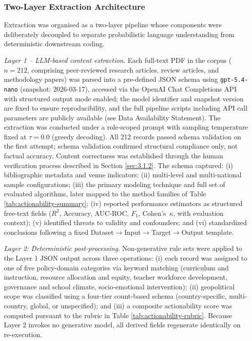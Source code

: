 \documentclass{ieeeaccess}
\begin{document}
\subsubsection{Two-Layer Extraction Architecture}\label{subsec:data-extraction}

Extraction was organised as a two-layer pipeline whose components were deliberately decoupled to separate probabilistic language understanding from deterministic downstream coding.

\emph{Layer 1 -- LLM-based content extraction.} Each full-text PDF in the corpus ($n = 212$, comprising peer-reviewed research articles, review articles, and methodology papers) was parsed into a pre-defined JSON schema using \texttt{gpt-5.4-nano} (snapshot: 2026-03-17), accessed via the OpenAI Chat Completions API with structured output mode enabled; the model identifier and snapshot version are fixed to ensure reproducibility, and the full pipeline scripts including API call parameters are publicly available (see Data Availability Statement). The extraction was conducted under a role-scoped prompt with sampling temperature fixed at $\tau = 0.0$ (greedy decoding). All 212 records passed schema validation on the first attempt; schema validation confirmed structural compliance only, not factual accuracy. Content correctness was established through the human verification process described in Section \ref{sec:3.1.2}. The schema captured: (i) bibliographic metadata and venue indicators; (ii) multi-level and multi-national sample configurations; (iii) the primary modeling technique and full set of evaluated algorithms, later mapped to the method families of Table \ref{tab:actionability-summary}; (iv) reported performance estimators as structured free-text fields ($R^2$, Accuracy, AUC-ROC, $F_1$, Cohen's~$\kappa$, with evaluation context); (v) identified threats to validity and confounders; and (vi) standardized conclusions following a fixed Dataset$\rightarrow$Input$\rightarrow$Target$\rightarrow$Output template.

\emph{Layer 2: Deterministic post-processing.} Non-generative rule sets were applied to the Layer 1 JSON output across three operations: (i) each record was assigned to one of five policy-domain categories via keyword matching (curriculum and instruction, resource allocation and equity, teacher workforce development, governance and school climate, socio-emotional intervention); (ii) geopolitical scope was classified using a four-tier count-based schema (country-specific, multi-country, global, or unspecified); and (iii) a composite actionability score was computed pursuant to the rubric in Table \ref{tab:actionability-rubric}. Because Layer 2 invokes no generative model, all derived fields regenerate identically on re-execution.
\end{document}
